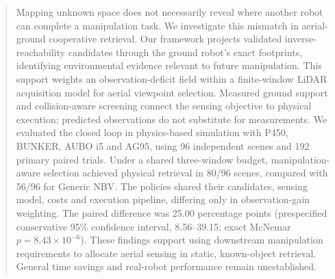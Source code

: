\begin{abstract}
Mapping unknown space does not necessarily reveal where another robot can
complete a manipulation task. We investigate this mismatch in aerial-ground
cooperative retrieval. Our framework projects validated inverse-reachability
candidates through the ground robot's exact footprints, identifying environmental
evidence relevant to future manipulation. This support weights an observation-deficit
field within a finite-window LiDAR acquisition model for aerial viewpoint selection.
Measured ground support and collision-aware screening connect the sensing objective
to physical execution; predicted observations do not substitute for measurements.
We evaluated the closed loop in physics-based simulation with P450, BUNKER,
AUBO i5 and AG95, using 96 independent scenes and 192 primary paired trials.
Under a shared three-window budget, manipulation-aware selection achieved physical
retrieval in 80/96 scenes, compared with 56/96 for Generic NBV.
The policies shared their candidates, sensing model, costs and execution pipeline,
differing only in observation-gain weighting. The paired difference was 25.00
percentage points (prespecified conservative 95\% confidence interval, 8.56--39.15;
exact McNemar $p=8.43\times10^{-6}$). These findings support using downstream
manipulation requirements to allocate aerial sensing in static, known-object
retrieval. General time savings and real-robot performance remain unestablished.
\end{abstract}
